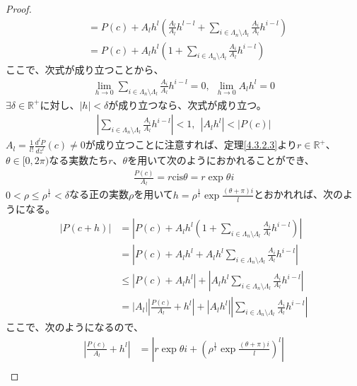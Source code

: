\documentclass[dvipdfmx]{jsarticle}
\begin{document}
\begin{proof}
\begin{align*}
&= P(c) + A_{l}h^{l}\left( \frac{A_{l}}{A_{l}}h^{l - l} + \sum_{i \in \varLambda_{n} \setminus \varLambda_{l}} {\frac{A_{i}}{A_{l}}h^{i - l}} \right)\\
&= P(c) + A_{l}h^{l}\left( 1 + \sum_{i \in \varLambda_{n} \setminus \varLambda_{l}} {\frac{A_{i}}{A_{l}}h^{i - l}} \right)
\end{align*}
ここで、次式が成り立つことから、
\begin{align*}
\lim_{h \rightarrow 0}{\sum_{i \in \varLambda_{n} \setminus \varLambda_{l}} {\frac{A_{i}}{A_{l}}h^{i - l}}} = 0,\ \ \lim_{h \rightarrow 0}{A_{l}h^{l}} = 0
\end{align*}
$\exists\delta \in \mathbb{R}^{+}$に対し、$|h| < \delta$が成り立つなら、次式が成り立つ。
\begin{align*}
\left| \sum_{i \in \varLambda_{n} \setminus \varLambda_{l}} {\frac{A_{i}}{A_{l}}h^{i - l}} \right| < 1,\ \ \left| A_{l}h^{l} \right| < \left| P(c) \right|
\end{align*}
$A_{l} = \frac{1}{l!}\frac{d^{l}P}{{dz}^{l}}(c) \neq 0$が成り立つことに注意すれば、定理\ref{4.3.2.3}より$r \in \mathbb{R}^{+}$、$\theta \in [ 0,2\pi)$なる実数たち$r$、$\theta$を用いて次のようにおかれることができ、
\begin{align*}
\frac{P(c)}{A_{l}} = r{\mathrm{cis}}\theta = r\exp{\theta i}
\end{align*}
$0 < \rho \leq \rho^{\frac{1}{l}} < \delta$なる正の実数$\rho$を用いて$h = \rho^{\frac{1}{l}}\exp\frac{(\theta + \pi)i}{l}$とおかれれば、次のようになる。
\begin{align*}
\left| P(c + h) \right| &= \left| P(c) + A_{l}h^{l}\left( 1 + \sum_{i \in \varLambda_{n} \setminus \varLambda_{l}} {\frac{A_{i}}{A_{l}}h^{i - l}} \right) \right|\\
&= \left| P(c) + A_{l}h^{l} + A_{l}h^{l}\sum_{i \in \varLambda_{n} \setminus \varLambda_{l}} {\frac{A_{i}}{A_{l}}h^{i - l}} \right|\\
&\leq \left| P(c) + A_{l}h^{l} \right| + \left| A_{l}h^{l}\sum_{i \in \varLambda_{n} \setminus \varLambda_{l}} {\frac{A_{i}}{A_{l}}h^{i - l}} \right|\\
&= \left| A_{l} \right|\left| \frac{P(c)}{A_{l}} + h^{l} \right| + \left| A_{l}h^{l} \right|\left| \sum_{i \in \varLambda_{n} \setminus \varLambda_{l}} {\frac{A_{i}}{A_{l}}h^{i - l}} \right|
\end{align*}
ここで、次のようになるので、
\begin{align*}
\left| \frac{P(c)}{A_{l}} + h^{l} \right| &= \left| r\exp{\theta i} + \left( \rho^{\frac{1}{l}}\exp\frac{(\theta + \pi)i}{l} \right)^{l} \right|\\

\end{align*}
\end{proof}
\end{document}
